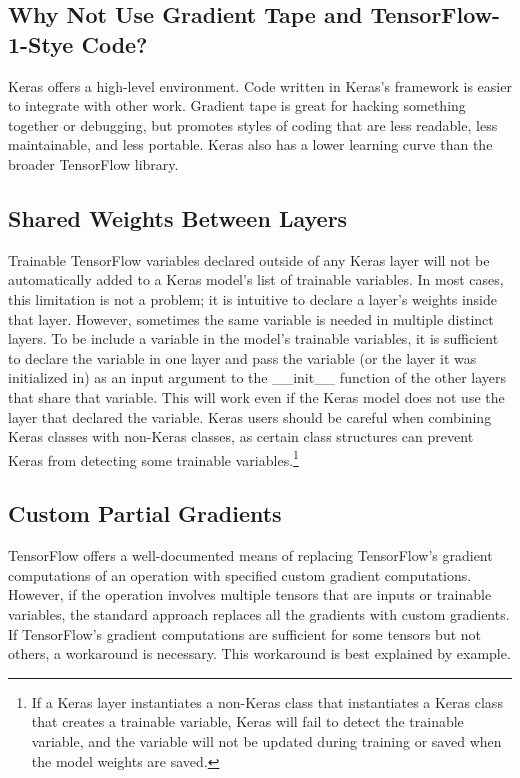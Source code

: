 \subsection{Why Not Use Gradient Tape and TensorFlow-1-Stye Code?}
Keras offers a high-level environment. Code written in Keras's framework is easier to integrate with other work. Gradient tape is great for hacking something together or debugging, but promotes styles of coding that are less readable, less maintainable, and less portable. Keras also has a lower learning curve than the broader TensorFlow library.


\subsection{Shared Weights Between Layers}
Trainable TensorFlow variables declared outside of any Keras layer will not be automatically added to a Keras model's list of trainable variables. In most cases, this limitation is not a problem; it is intuitive to declare a layer's weights inside that layer. However, sometimes the same variable is needed in multiple distinct layers. To be include a variable in the model's trainable variables, it is sufficient to declare the variable in one layer and pass the variable (or the layer it was initialized in) as an input argument to the \_\_init\_\_ function of the other layers that share that variable. This will work even if the Keras model does not use the layer that declared the variable. Keras users should be careful when combining Keras classes with non-Keras classes, as certain class structures can prevent Keras from detecting some trainable variables.\footnote{If a Keras layer instantiates a non-Keras class that instantiates a Keras class that creates a trainable variable, Keras will fail to detect the trainable variable, and the variable will not be updated during training or saved when the model weights are saved.}

\subsection{Custom Partial Gradients}
TensorFlow offers a well-documented means of replacing TensorFlow's gradient computations of an operation with specified custom gradient computations. However, if the operation involves multiple tensors that are inputs or trainable variables, the standard approach replaces all the gradients with custom gradients. If TensorFlow's gradient computations are sufficient for some tensors but not others, a workaround is necessary. This workaround is best explained by example.

